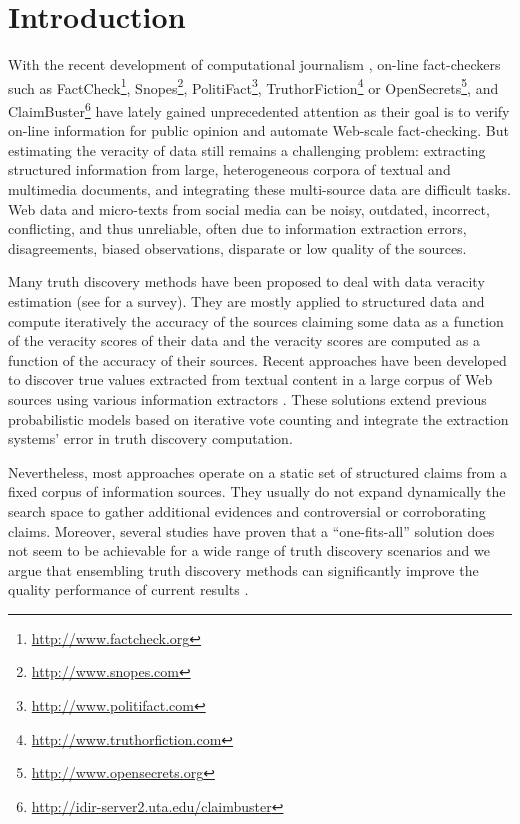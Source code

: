 \section{Introduction}

With the recent development of computational journalism \cite{Cohen2011, Hassan15}, on-line fact-checkers such as FactCheck\footnote{ {\scriptsize\url{http://www.factcheck.org}}}, Snopes\footnote{{\scriptsize\url{http://www.snopes.com}}}, PolitiFact\footnote{{\scriptsize \url{http://www.politifact.com}}}, TruthorFiction\footnote{{\scriptsize\url{http://www.truthorfiction.com}}} or OpenSecrets\footnote{{\scriptsize \url{http://www.opensecrets.org}}}, and ClaimBuster\footnote{{\scriptsize\url{http://idir-server2.uta.edu/claimbuster}}} have lately gained unprecedented attention as their goal is to verify on-line information for  public opinion and automate Web-scale fact-checking.
But estimating the veracity of data still remains  a  challenging problem: extracting structured information from large, heterogeneous corpora of textual and multimedia documents, and  integrating these  multi-source data are difficult tasks. Web  data and micro-texts from social media can be noisy, outdated, incorrect, conflicting, and thus unreliable, often due to information extraction errors, disagreements, biased observations, disparate or low quality of the sources. 
 
 Many truth discovery methods have been proposed to deal with data veracity estimation (see \cite{Berti2015} for a survey). They are mostly applied to structured data and compute iteratively the accuracy of the sources claiming some data as a function of the veracity scores of their data and the veracity scores are computed as a function of the accuracy of their sources. Recent approaches have been developed to discover true values extracted from textual content in a large corpus of Web sources using various information extractors \cite{Dong2014,YuHCJWZHVM14}.  
These solutions extend previous probabilistic models based on iterative vote counting and integrate the extraction systems' error in truth discovery computation.
 
 Nevertheless, most approaches operate on a static set of structured claims from a fixed corpus of information sources. They usually do not expand dynamically the search space to gather additional evidences and controversial or corroborating claims. Moreover, several studies have proven that a ``one-fits-all'' solution does not seem to be achievable for a wide range of truth discovery scenarios \cite{Wagui14} and we argue that ensembling truth discovery methods can significantly improve the quality performance of current results \cite{BigData15}.
 
